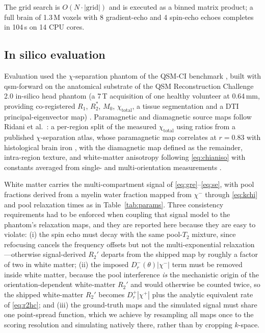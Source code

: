 \documentclass[AMA,STIX2COL,Linenumberson]{MRM}
\begin{document}
The grid search is $O(N\cdot|\text{grid}|)$ and is executed as a binned matrix product; a full brain of 1.3\,M voxels with 8 gradient-echo and 4 spin-echo echoes completes in 104\,s on 14 CPU cores.

\subsection{In silico evaluation}

Evaluation used the $\chi$-separation phantom of the QSM-CI benchmark \cite{stewart_qsmci_2026}, built with qsm-forward \cite{qsmforward_2026} on the anatomical substrate of the QSM Reconstruction Challenge 2.0 in-silico head phantom (a 7\,T acquisition of one healthy volunteer at 0.64\,mm, providing co-registered $R_1$, $R_2^{*}$, $M_0$, $\chi_{\mathrm{total}}$, a tissue segmentation and a DTI principal-eigenvector map) \cite{marques_qsm_2021}. Paramagnetic and diamagnetic source maps follow Ridani et al.\ \cite{ridani_realistic_2026}: a per-region split of the measured $\chi_{\mathrm{total}}$ using ratios from a published $\chi$-separation atlas, whose paramagnetic map correlates at $r=0.83$ with histological brain iron \cite{hallgren_nonhaemin_1958}, with the diamagnetic map defined as the remainder, intra-region texture, and white-matter anisotropy following \eqref{eq:chianiso} with constants averaged from single- and multi-orientation measurements \cite{sibgatulin_anisotropy_TODO,li_anisotropy_TODO}.

White matter carries the multi-compartment signal of \eqref{eq:gre}--\eqref{eq:se}, with pool fractions derived from a myelin water fraction mapped from $\chi^{-}$ through \eqref{eq:kchi} and pool relaxation times as in Table~\ref{tab:params}. Three consistency requirements had to be enforced when coupling that signal model to the phantom's relaxation maps, and they are reported here because they are easy to violate: (i) the spin echo must decay with the same pool-$T_2$ mixture, since refocusing cancels the frequency offsets but not the multi-exponential relaxation---otherwise signal-derived $R_2'$ departs from the shipped map by roughly a factor of two in white matter; (ii) the imposed $D_r^{-}(\theta)|\chi^{-}|$ term must be removed inside white matter, because the pool interference \emph{is} the mechanistic origin of the orientation-dependent white-matter $R_2'$ and would otherwise be counted twice, so the shipped white-matter $R_2'$ becomes $D_r^{+}|\chi^{+}|$ plus the analytic equivalent rate of \eqref{eq:r2hc}; and (iii) the ground-truth maps and the simulated signal must share one point-spread function, which we achieve by resampling all maps once to the scoring resolution and simulating natively there, rather than by cropping $k$-space.
\end{document}
